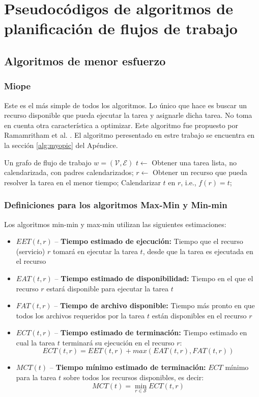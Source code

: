 \chapter{Pseudocódigos de algoritmos de planificación de flujos de trabajo}

\section{Algoritmos de menor esfuerzo}
\subsection{Miope}
Este es el más simple de todos los algoritmos. Lo único que hace es buscar un recurso disponible que pueda ejecutar la tarea y asignarle dicha tarea. No toma en cuenta otra característica a optimizar. Este algoritmo fue propuesto por Ramamritham et al. \cite{ramamritham1990efficient}. El algoritmo \cite{yu2008workflow} peresentado en estre trabajo se encuentra en la sección \ref{alg:myopic} del Apéndice.

\label{alg:myopic}
\begin{algorithmic}[1]
\Require Un grafo de flujo de trabajo $w=(\mathcal{V}, \mathcal{E})$
	\State $t \gets$ Obtener una tarea lista, no calendarizada, con padres calendarizados;
	\State $r \gets$ Obtener un recurso que pueda resolver la tarea en el menor tiempo;
	\State Calendarizar $t$ en $r$, i.e., $f(r) = t$;
\EndWhile
\end{algorithmic}

\subsection{Definiciones para los algoritmos Max-Min y Min-min}
Los algoritmos min-min y max-min utilizan las siguientes  estimaciones: %
\begin{itemize}
\item{$EET(t,r)$ -- \textbf{Tiempo estimado de ejecución:} Tiempo que el recurso (servicio) $r$ tomará en ejecutar la tarea $t$, desde que la tarea es ejecutada en el recurso}
\item{$EAT(t,r)$ -- \textbf{Tiempo estimado de disponibilidad:} Tiempo en el que el recurso $r$ estará disponible para ejecutar la tarea $t$}
\item{$FAT(t,r)$ -- \textbf{Tiempo de archivo disponible:} Tiempo más pronto en que todos los archivos requeridos por la tarea $t$ están disponibles en el recurso $r$}
\item{$ECT(t,r)$ -- \textbf{Tiempo estimado de terminación:} Tiempo estimado en cual la tarea $t$ terminará su ejecución en el recurso $r$: 
              \[ ECT(t,r) = EET(t,r) + max(EAT(t,r), FAT(t,r)) \]}
\item{$MCT(t)$ -- \textbf{Tiempo mínimo estimado de terminación: } $ECT$ mínimo para la tarea $t$ sobre todos los recursos disponibles, es decir: 
            \[ MCT(t) = \min_{r \in \mathcal{S}} ECT(t,r) \]}
\end{itemize}

